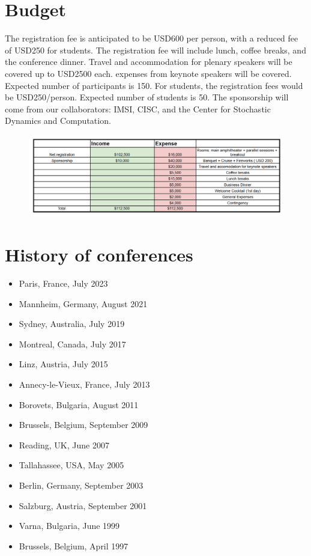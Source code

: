 \documentclass{article}
\begin{document}
\section{Budget}
The registration fee is anticipated to be USD600 per person, with a reduced fee of USD250 for students.  The registration fee will include lunch, coffee breaks, and the conference dinner. Travel and accommodation for plenary speakers will be covered up to USD2500 each. expenses from keynote speakers will be covered. Expected number of participants is 150. For students, the registration fees would be USD250/person. Expected number of students is 50. The sponsorship will come from our collaborators: IMSI, CISC, and the Center for Stochastic Dynamics and Computation.






\begin{figure}[h]
    \centering
    \includegraphics[width =.95\textwidth]{budgetv4.png}
\end{figure}


\section{History of conferences}
\begin{itemize}
\item Paris, France, July 2023
\item  Mannheim, Germany, August 2021
\item Sydney, Australia, July 2019
\item Montreal, Canada, July 2017
\item  Linz, Austria, July 2015
\item  Annecy-le-Vieux, France, July 2013
\item  Borovets, Bulgaria, August 2011
\item  Brussels, Belgium, September 2009
\item  Reading, UK, June 2007
\item  Tallahassee, USA, May 2005
\item  Berlin, Germany, September 2003
\item  Salzburg, Austria, September 2001
\item  Varna, Bulgaria, June 1999
\item  Brussels, Belgium, April 1997
\end{itemize}
\end{document}
